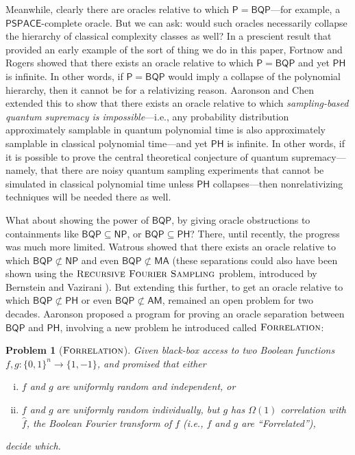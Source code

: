 \documentclass[10pt,a4paper]{article}
\newtheorem{problem}[theorem]{Problem}
\newcommand{\Forrelation}{\normalfont\textsc{Forrelation}}
\begin{document}
Meanwhile, clearly there are oracles relative to which $\mathsf{P}=\mathsf{BQP}$---for example, a $\mathsf{PSPACE}$-complete oracle.  But we can ask: would such oracles necessarily collapse the hierarchy of classical complexity classes as well?  In a prescient result that provided an early example of the sort of thing we do in this paper, Fortnow and Rogers \cite{FR98} showed that there exists an oracle relative to which $\mathsf{P}=\mathsf{BQP}$ and yet $\mathsf{PH}$ is infinite.  In other words, if $\mathsf{P}=\mathsf{BQP}$ would imply a collapse of the polynomial hierarchy, then it cannot be for a relativizing reason.  Aaronson and Chen \cite{AC17} extended this to show that there exists an oracle relative to which \textit{sampling-based quantum supremacy is impossible}---i.e., any probability distribution approximately samplable in quantum polynomial time is also approximately samplable in classical polynomial time---and yet $\mathsf{PH}$ is infinite.  In other words, if it is possible to prove the central theoretical conjecture of
quantum supremacy---namely, that there are noisy quantum sampling
experiments that cannot be simulated in classical polynomial time
unless $\mathsf{PH}$ collapses---then nonrelativizing techniques will be needed there as well.

What about showing the power of $\mathsf{BQP}$, by giving oracle obstructions to containments like $\mathsf{BQP}\subseteq\mathsf{NP}$, or $\mathsf{BQP}\subseteq\mathsf{PH}$?  There, until recently, the progress was much more limited.  Watrous \cite{Wat00} showed that there exists an oracle relative to which $\mathsf{BQP}\not\subset\mathsf{NP}$ and even $\mathsf{BQP}\not\subset\mathsf{MA}$ (these separations could also have been shown using the $\textsc{Recursive Fourier Sampling}$ problem, introduced by Bernstein and Vazirani \cite{BV97}).  But extending this further, to get an oracle relative to which $\mathsf{BQP}\not\subset\mathsf{PH}$ or even $\mathsf{BQP}\not\subset\mathsf{AM}$, remained an open problem for two decades.  Aaronson \cite{Aar10} proposed a program for proving an oracle separation between $\mathsf{BQP}$ and $\mathsf{PH}$, involving a new problem he introduced called $\Forrelation$:

\begin{problem}[$\Forrelation$]
Given black-box access to two Boolean functions $f,g:\{0,1\}^n \to \{1,-1\}$, and promised that either
\begin{enumerate}[(i)]
\item $f$ and $g$ are uniformly random and independent, or
\item $f$ and $g$ are uniformly random individually, but $g$ has $\Omega(1)$ correlation with $\hat{f}$, the Boolean Fourier transform of $f$ (i.e., $f$ and $g$ are ``Forrelated''),
\end{enumerate}
decide which.
\end{problem}
\end{document}
